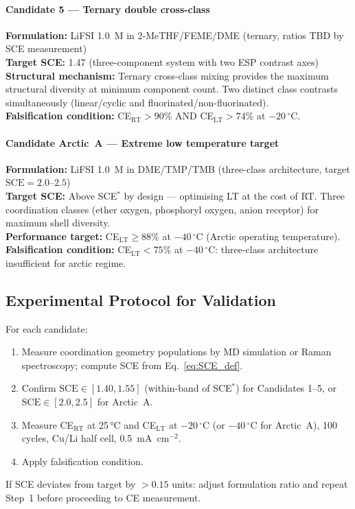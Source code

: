 \documentclass[11pt]{article}
\theoremstyle{plain}
\theoremstyle{definition}
\theoremstyle{remark}
\begin{document}
\paragraph{Candidate 5 --- Ternary double cross-class}
\textbf{Formulation:} LiFSI 1.0~M in 2-MeTHF/FEME/DME (ternary, ratios TBD
by SCE measurement)\\
\textbf{Target SCE:} 1.47 (three-component system with two ESP contrast axes)\\
\textbf{Structural mechanism:} Ternary cross-class mixing provides the maximum
structural diversity at minimum component count.  Two distinct class contrasts
simultaneously (linear/cyclic and fluorinated/non-fluorinated).\\
\textbf{Falsification condition:} CE$_{\mathrm{RT}} > 90\%$ AND
CE$_{\mathrm{LT}} > 74\%$ at $-20\,^{\circ}$C.

\paragraph{Candidate Arctic~A --- Extreme low temperature target}
\textbf{Formulation:} LiFSI 1.0~M in DME/TMP/TMB (three-class architecture,
target $\mathrm{SCE}=2.0$--$2.5$)\\
\textbf{Target SCE:} Above SCE$^{*}$ by design --- optimising LT at the cost
of RT. Three coordination classes (ether oxygen, phosphoryl oxygen, anion
receptor) for maximum shell diversity.\\
\textbf{Performance target:} CE$_{\mathrm{LT}} \geq 88\%$ at $-40\,^{\circ}$C
(Arctic operating temperature).\\
\textbf{Falsification condition:} CE$_{\mathrm{LT}} < 75\%$ at $-40\,^{\circ}$C:
three-class architecture insufficient for arctic regime.

\subsection{Experimental Protocol for Validation}

For each candidate:
\begin{enumerate}[leftmargin=2em]
  \item Measure coordination geometry populations by MD simulation or Raman
        spectroscopy; compute SCE from Eq.~\eqref{eq:SCE_def}.
  \item Confirm $\mathrm{SCE} \in [1.40, 1.55]$ (within-band of SCE$^{*}$)
        for Candidates 1--5, or $\mathrm{SCE} \in [2.0, 2.5]$ for Arctic~A.
  \item Measure CE$_{\mathrm{RT}}$ at 25\,°C and CE$_{\mathrm{LT}}$ at
        $-20\,^{\circ}$C (or $-40\,^{\circ}$C for Arctic~A), 100 cycles,
        Cu/Li half cell, 0.5~mA~cm$^{-2}$.
  \item Apply falsification condition.
\end{enumerate}
If SCE deviates from target by $> 0.15$ units: adjust formulation ratio and
repeat Step~1 before proceeding to CE measurement.
\end{document}
